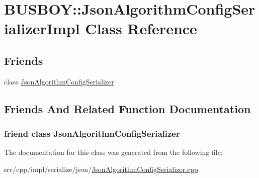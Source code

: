 \hypertarget{classBUSBOY_1_1JsonAlgorithmConfigSerializerImpl}{
\section{BUSBOY::JsonAlgorithmConfigSerializerImpl Class Reference}
\label{classBUSBOY_1_1JsonAlgorithmConfigSerializerImpl}
}
\subsection*{Friends}
\begin{DoxyCompactItemize}
\item 
class \hyperlink{classBUSBOY_1_1JsonAlgorithmConfigSerializerImpl_aa574fbafda8a9ffec11f507dbadbbe53}{JsonAlgorithmConfigSerializer}
\end{DoxyCompactItemize}


\subsection{Friends And Related Function Documentation}
\hypertarget{classBUSBOY_1_1JsonAlgorithmConfigSerializerImpl_aa574fbafda8a9ffec11f507dbadbbe53}{
\subsubsection[{JsonAlgorithmConfigSerializer}]{\setlength{\rightskip}{0pt plus 5cm}friend class {\bf JsonAlgorithmConfigSerializer}}}
\label{classBUSBOY_1_1JsonAlgorithmConfigSerializerImpl_aa574fbafda8a9ffec11f507dbadbbe53}


The documentation for this class was generated from the following file:\begin{DoxyCompactItemize}
\item 
src/cpp/impl/serialize/json/\hyperlink{JsonAlgorithmConfigSerializer_8cpp}{JsonAlgorithmConfigSerializer.cpp}\end{DoxyCompactItemize}
